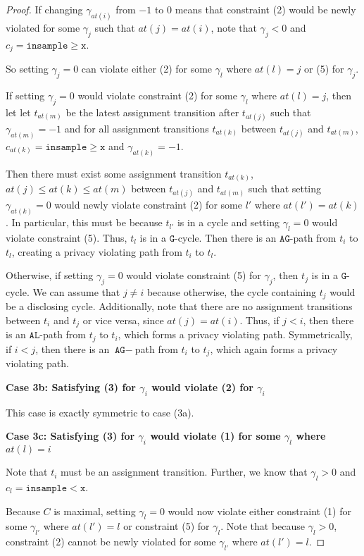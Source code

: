 \documentclass[12pt]{article}
\newcommand{\gguard}[1][x]{\texttt{insample}\geq #1}
\newcommand{\lguard}[1][x]{\texttt{insample} < #1}
\theoremstyle{definition}
\begin{document}
\begin{proof}
    If changing $\gamma_{at(i)}$ from $-1$ to $0$ means that constraint (2) would be newly violated for some $\gamma_j$ such that $at(j) = at(i)$, note that $\gamma_j < 0$ and $c_j = \gguard[\texttt{x}]$. 
    
    So setting $\gamma_j = 0$ can violate either (2) for some $\gamma_l$ where $at(l) = j$ or (5) for $\gamma_j$. 

    If setting $\gamma_j = 0$ would violate constraint (2) for some $\gamma_l$ where $at(l) = j$, then let let $t_{at(m)}$ be the latest assignment transition after $t_{at(j)}$ such that $\gamma_{at(m)} = -1$ and for all assignment transitions $t_{at(k)}$ between $t_{at(j)}$ and $t_{at(m)}$, $c_{at(k)} = \gguard[\texttt{x}]$ and $\gamma_{at(k)} = -1$. 
    
    Then there must exist some assignment transition $t_{at(k)}$, $at(j)\leq at(k)\leq at(m)$ between $t_{at(j)}$ and $t_{at(m)}$ such that setting $\gamma_{at(k)} = 0$ would newly violate constraint (2) for some $l'$ where $at(l') = at(k)$. 
    In particular, this must be because $t_{l'}$ is in a cycle and setting $\gamma_l = 0$ would violate constraint (5). Thus, $t_l$ is in a $\texttt{G}$-cycle. Then there is an $\texttt{AG}$-path from $t_i$ to $t_l$, creating a privacy violating path from $t_i$ to $t_l$. 

    Otherwise, if setting $\gamma_j = 0$ would violate constraint (5) for $\gamma_j$, then $t_j$ is in a $\texttt{G}$-cycle. We can assume that $j\neq i$ because otherwise, the cycle containing $t_j$ would be a disclosing cycle. Additionally, note that there are no assignment transitions between $t_i$ and $t_j$ or vice versa, since $at(j) = at(i)$.
    Thus, if $j<i$, then there is an $\texttt{AL}$-path from $t_j$ to $t_i$, which forms a privacy violating path. Symmetrically, if $i<j$, then there is an $\texttt{AG}-$path from $t_i$ to $t_j$, which again forms a privacy violating path. 

    \textbf{Case 3b: Satisfying (3) for $\gamma_i$ would violate (2) for $\gamma_i$}

    This case is exactly symmetric to case (3a).

    \textbf{Case 3c: Satisfying (3) for $\gamma_i$ would violate (1) for some $\gamma_l$ where $at(l) = i$}

    Note that $t_i$ must be an assignment transition. Further, we know that $\gamma_l>0$ and $c_l = \lguard[\texttt{x}]$. 
    
    Because $C$ is maximal, setting $\gamma_l=0$ would now violate either constraint (1) for some $\gamma_{l'}$ where $at(l') = l$ or constraint (5) for $\gamma_l$. Note that because $\gamma_l>0$, constraint (2) cannot be newly violated for some $\gamma_{l'}$ where $at(l') = l$.


\end{proof}
\end{document}
